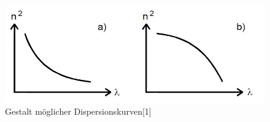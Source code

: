 	\begin{figure}[h]
		\begin{center}
		\includegraphics[scale=0.7]{picdispkurve.jpg}
		\caption{Gestalt möglicher Dispersionskurven[1]}
		\label{picdispkurve}
		\end{center}	
	\end{figure}
